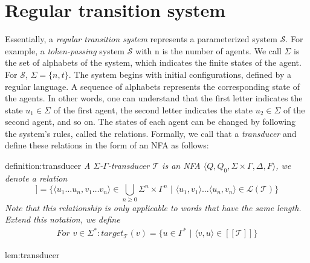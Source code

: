 \section{Regular transition system}\label{section:rts}
Essentially, a \textit{regular transition system} represents a parameterized system $\mathcal{S}$.
For example, a \textit{token-passing} system $\mathcal{S}$ with n is the number
of agents. We call $\Sigma$ is the set of alphabets of the system, which indicates the finite states of the agent. 
For $\mathcal{S}$, $\Sigma = \{n, t\}$.
The system begins with initial configurations, defined by a regular language.
A sequence of alphabets represents the corresponding state of the agents.
In other words, one can understand that the first letter indicates the state $u_1 \in \Sigma$ of the first agent, 
the second letter indicates the state $u_2 \in \Sigma$ of the second agent, and so on.
The states of each agent can be changed by following the system's rules,
called the relations. Formally, we call that a \textit{transducer} and define these relations in the form of an NFA as follows:
\begin{theo}[Transducer]{definition:transducer}
    \textit{
        A $\Sigma$-$\Gamma$-\textit{transducer} $\mathcal{T}$ is an \textit{NFA} 
        $\langle Q, Q_0, \Sigma \times \Gamma, \Delta, F \rangle$,
        we denote a relation 
        \begin{equation*}
          [[\mathcal{T}]] = \lbrace \langle u_1 \dots u_n, v_1 \dots v_n \rangle \in \bigcup_{n \geq 0} \Sigma^{n} \times \Gamma^{n} 
          \,\,|\,\, \langle u_1, v_1 \rangle \dots \langle u_n, v_n \rangle \in \mathcal{L}(\mathcal{T}) \rbrace 
        \end{equation*}
        Note that this relationship is only applicable to words that have the same length.
        Extend this notation, we define
        \begin{align*} 
            For \,\, v \in \Sigma^*: target_{\mathcal{T}}(v) = \lbrace u \in \Gamma^*\,\, | \,\, \langle v,u \rangle \in [[\mathcal{T}]] \rbrace 
        \end{align*}
    }
\end{theo}
\begin{lem}{lem:transducer}
\end{lem}


